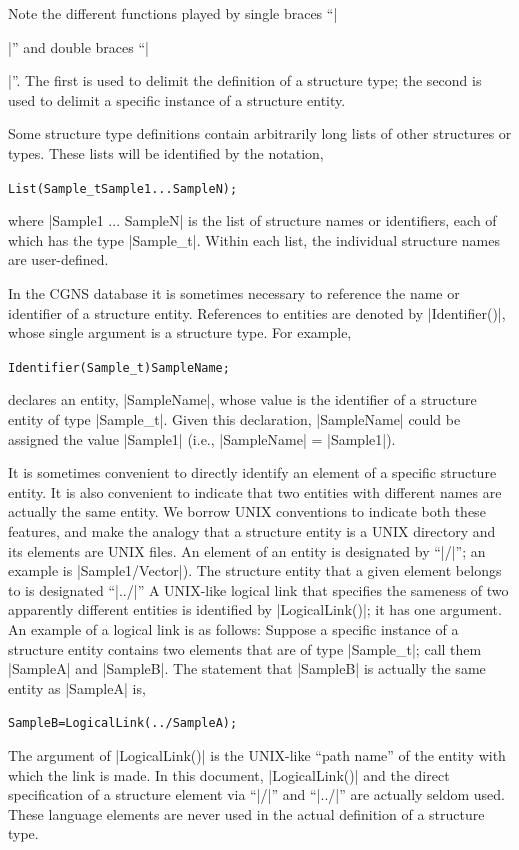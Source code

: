 Note the different functions played by single braces ``|{|'' and double
braces ``|{{|''.
The first is used to delimit the definition of a structure type; the
second is used to delimit a specific instance of a structure entity.

Some structure type definitions contain arbitrarily long lists of other
structures or types.
These lists will be identified by the notation,
\begin{alltt}
  List( Sample\_t Sample1 ... SampleN ) ;
\end{alltt}
where |Sample1 ... SampleN| is the list of structure names or
identifiers, each of which has the type |Sample_t|.
Within each list, the individual structure names are user-defined.

In the CGNS database it is sometimes necessary to reference the name or
identifier of a structure entity.  References to entities are denoted by
|Identifier()|, whose single argument is a structure type.  For example,
\begin{alltt}
  Identifier(Sample\_t) SampleName ;
\end{alltt}
declares an entity, |SampleName|, whose value is the identifier of
a structure entity of type |Sample_t|.
Given this declaration, |SampleName| could be assigned the value
|Sample1| (i.e., |SampleName| = |Sample1|).

It is sometimes convenient to directly identify an element of a specific
structure entity.  It is also convenient to indicate that two entities
with different names are actually the same entity.  We borrow UNIX
conventions to indicate both these features, and make the analogy
that a structure entity is a UNIX directory and its elements are UNIX
files.  An element of an entity is designated by ``|/|''; an example is
|Sample1/Vector|).  The structure entity that a given element belongs
to is designated ``|../|'' A UNIX-like logical link that specifies
the sameness of two apparently different entities is identified by
|LogicalLink()|; it has one argument.  An example of a logical link is
as follows:  Suppose a specific instance of a structure entity contains
two elements that are of type |Sample_t|; call them |SampleA| and
|SampleB|.  The statement that |SampleB| is actually the same entity as
|SampleA| is,
\begin{alltt}
  SampleB = LogicalLink(../SampleA) ;
\end{alltt}
The argument of |LogicalLink()| is the UNIX-like ``path name'' of the
entity with which the link is made.
In this document, |LogicalLink()| and the direct specification of a
structure element via ``|/|'' and ``|../|'' are actually seldom used.
These language elements are never used in the actual definition of a
structure type.

}}}
